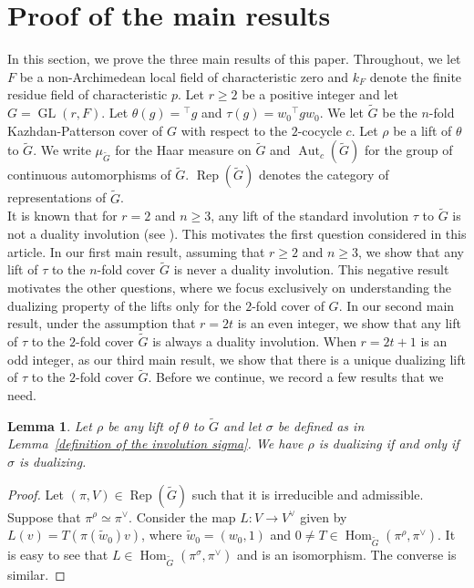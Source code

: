 \documentclass[11pt, a4paper, reqno]{amsart}
\newtheorem{lemma}[theorem]{Lemma}
\theoremstyle{definition}
\theoremstyle{remark}
\theoremstyle{example}
\theoremstyle{note}
\numberwithin{equation}{section}
\DeclareMathOperator{\Hom}{Hom}
\DeclareMathOperator{\GL}{GL}
\DeclareMathOperator{\Aut}{Aut}
\DeclareMathOperator{\Rep}{Rep}
\begin{document}
\section{Proof of the main results}\label{main results} In this section, we prove the three main results of this paper. Throughout, we let $F$ be a non-Archimedean local field of characteristic zero and $k_{F}$ denote the finite residue field of characteristic $p$. Let $r\geq 2$ be a positive integer and let $G=\GL(r,F)$. Let $\theta(g)={}^{\top}g$ and $\tau(g)=w_{0}{}^{\top}g w_{0}$. We let $\widetilde{G}$ be the $n$-fold Kazhdan-Patterson cover of $G$ with respect to the $2$-cocycle $c$. Let $\rho$ be a lift of $\theta$ to $\widetilde{G}$. We write $\mu_{\widetilde{G}}$ for the Haar measure on $\widetilde{G}$ and $\Aut_{c}(\widetilde{G})$ for the group of continuous automorphisms of $\widetilde{G}$.  $\Rep(\widetilde{G})$ denotes the category of representations of $\widetilde{G}$.
\\

It is known that for $r=2$ and $n\geq 3$, any lift of the standard involution $\tau$ to $\widetilde{G}$ is not a duality involution (see \cite{Kumar-Renu-Sanjeev-Varsha}). This motivates the first question considered in this article. In our first main result, assuming that $r\geq 2$ and $n\geq 3$,  we show that any lift of $\tau$ to the $n$-fold cover $\widetilde{G}$ is never a duality involution. This negative result motivates the other questions, where we focus exclusively on understanding the dualizing property of the lifts only for the $2$-fold cover of $G$. In our second main result, under the assumption that $r=2t$ is an even integer, we show that any lift of $\tau$ to the $2$-fold cover $\widetilde{G}$ is always a duality involution. When $r=2t+1$ is an odd integer, as our third main result, we show that there is a unique dualizing lift of $\tau$ to the $2$-fold cover $\widetilde{G}$. Before we continue, we record a few results that we need. 


\begin{lemma}\label{sigma-rho dualizing property} Let $\rho$ be any lift of $\theta$ to $\widetilde{G}$ and let $\sigma$ be defined as in Lemma~\ref{definition of the involution sigma}. We have $\rho$ is dualizing if and only if $\sigma$ is dualizing. %
\end{lemma}
 
\begin{proof}  Let $(\pi,V)\in \Rep(\widetilde{G})$ such that it is irreducible and admissible. Suppose that $\pi^{\rho}\simeq \pi^{\vee}$. Consider the map $L: V \to V^\vee$ given by $L(v)=T(\pi(\tilde{w}_0)v)$, where $ \tilde{w}_0 = (w_0, 1)$ and $0 \neq T\in \Hom_{\widetilde{G}}(\pi^\rho, \pi^\vee)$. It is easy to see that $L\in \Hom_{\widetilde{G}}(\pi^\sigma, \pi^\vee)$ and is an isomorphism. The converse is similar.  
\end{proof}
\end{document}
